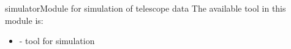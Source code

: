 \begin{ahmodule}{simulator}{Module for simulation of telescope data}
\noindent The available tool in this module is:

\begin{itemize}

\item {} - tool for simulation
\end{itemize}


\ahobjs{}
\ahfuncs{}



\end{ahmodule}
